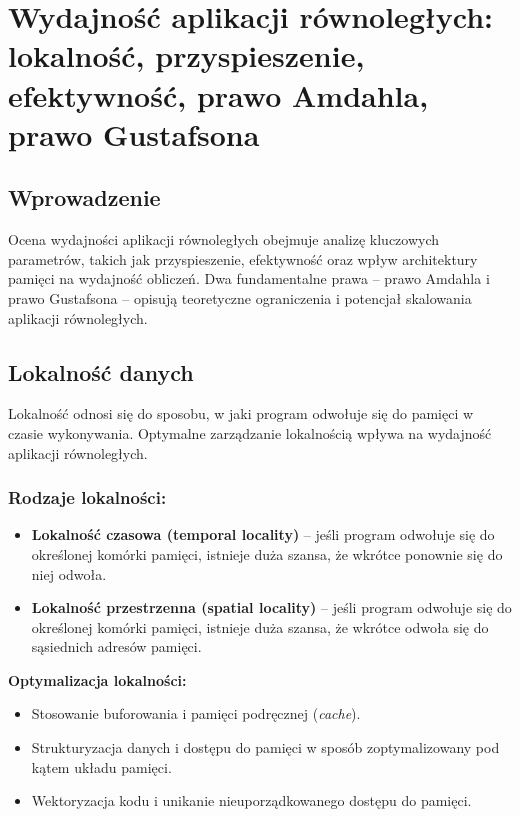 \section{Wydajność aplikacji równoległych: lokalność, przyspieszenie, efektywność, prawo Amdahla, prawo Gustafsona}

\subsection{Wprowadzenie}
Ocena wydajności aplikacji równoległych obejmuje analizę kluczowych parametrów, takich jak przyspieszenie, efektywność oraz wpływ architektury pamięci na wydajność obliczeń. Dwa fundamentalne prawa – prawo Amdahla i prawo Gustafsona – opisują teoretyczne ograniczenia i potencjał skalowania aplikacji równoległych.

\subsection{Lokalność danych}
Lokalność odnosi się do sposobu, w jaki program odwołuje się do pamięci w czasie wykonywania. Optymalne zarządzanie lokalnością wpływa na wydajność aplikacji równoległych.

\subsubsection{Rodzaje lokalności:}
\begin{itemize}
    \item \textbf{Lokalność czasowa (temporal locality)} – jeśli program odwołuje się do określonej komórki pamięci, istnieje duża szansa, że wkrótce ponownie się do niej odwoła.
    \item \textbf{Lokalność przestrzenna (spatial locality)} – jeśli program odwołuje się do określonej komórki pamięci, istnieje duża szansa, że wkrótce odwoła się do sąsiednich adresów pamięci.
\end{itemize}

\textbf{Optymalizacja lokalności:}
\begin{itemize}
    \item Stosowanie buforowania i pamięci podręcznej (\textit{cache}).
    \item Strukturyzacja danych i dostępu do pamięci w sposób zoptymalizowany pod kątem układu pamięci.
    \item Wektoryzacja kodu i unikanie nieuporządkowanego dostępu do pamięci.
\end{itemize}

